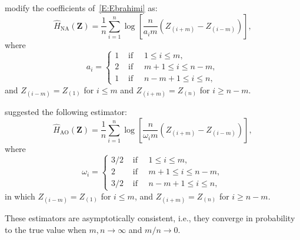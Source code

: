 	 
\citet{rohtua} modify the coefficients of~\eqref{E:Ebrahimi} as: 
\begin{equation}
\label{E:NA}
\widehat{H}_{\text{NA}}(\bm{Z})=\frac{1}{n} \sum_{i=1}^n \log \left[\frac{n}{a_i m}\left(Z_{(i+m)}-Z_{(i-m)}\right)\right],
\end{equation}
where
$$
a_i=\begin{cases}
1 & \text { if } \quad 1 \leq i \leq m, \\
2 & \text { if } \quad m+1 \leq i \leq n-m, \\
1 & \text { if } \quad n-m+1 \leq i \leq n,
\end{cases}
$$
and $Z_{(i-m)}=Z_{(1)}$ for $i \leq m$ and $Z_{(i+m)}=Z_{(n)}$ for $i \geq n-m$.

\citet{IbrahimAlOmari2014} suggested the following estimator:
	\begin{equation}
\label{E:AO}
  \widehat{H}_{\text{AO}}(\bm{Z})=\frac{1}{n} \sum_{i=1}^n \log \left[\frac{n}{\omega_i m}\left(Z_{(i+m)}-Z_{(i-m)}\right)\right],
 \end{equation}
	where \[
  \omega_i= \begin{cases}3/2 & \text { if }\quad 1 \leq i \leq m, \\ 2 & \text { if }\quad m+1 \leq i \leq n-m, \\ 3/2 & \text { if } \quad n-m+1 \leq i \leq n,\end{cases}
  \] in which \(Z_{(i-m)}=Z_{(1)}\) for \(i \leq m\), and
  \(Z_{(i+m)}=Z_{(n)}\) for \(i \geq n-m\).


These estimators are asymptotically consistent, i.e., they converge in
probability to the true value when \(m,n\rightarrow\infty\) and
\(m/n\rightarrow0\). 



